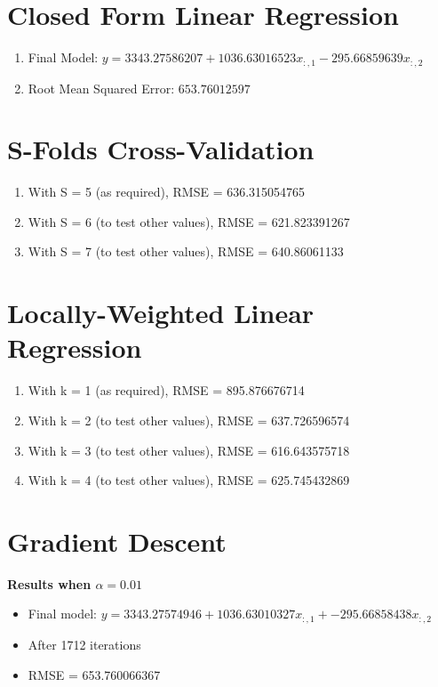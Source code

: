 \documentclass[12pt]{article}
\begin{document}
\newpage
\section{Closed Form Linear Regression}\label{linreg}

\begin{enumerate}
\item Final Model: $y=3343.27586207+1036.63016523x_{:,1} - 295.66859639x_{:,2}$
\item Root Mean Squared Error: $653.76012597$
\end{enumerate}

\section{S-Folds Cross-Validation}\label{linreg}

\begin{enumerate}
\item With S = 5 (as required), RMSE = 636.315054765
\item With S = 6 (to test other values), RMSE = 621.823391267
\item With S = 7 (to test other values), RMSE = 640.86061133
\end{enumerate}

\section{Locally-Weighted Linear Regression}
\begin{enumerate}
\item With k = 1 (as required), RMSE = 895.876676714
\item With k = 2 (to test other values), RMSE = 637.726596574
\item With k = 3 (to test other values), RMSE = 616.643575718
\item With k = 4 (to test other values), RMSE = 625.745432869
\end{enumerate}


\newpage
\section{Gradient Descent}

\textbf{Results when $\alpha=0.01$}
\begin{itemize}
\item Final model: $y = 3343.27574946 + 1036.63010327x_{:,1} + -295.66858438x_{:,2}$
\item After 1712 iterations
\item RMSE = 653.760066367
\end{itemize}
\end{document}

